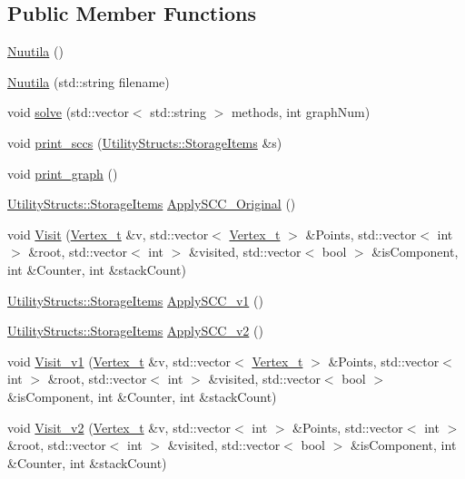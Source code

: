 \subsection*{Public Member Functions}
\begin{DoxyCompactItemize}
\item 
\hyperlink{class_nuutila_ab1ae0281145f693a922f5122d27cc23b}{Nuutila} ()
\item 
\hyperlink{class_nuutila_a00bb9066a5a1c9fb03e25481f4f47a0c}{Nuutila} (std\+::string filename)
\item 
void \hyperlink{class_nuutila_ae56bd15d2e57366eef0e044bf3a37d9e}{solve} (std\+::vector$<$ std\+::string $>$ methods, int graph\+Num)
\item 
void \hyperlink{class_nuutila_ae11b94c396dff5b8d9b7f69ae0d0831f}{print\+\_\+sccs} (\hyperlink{struct_utility_structs_1_1_storage_items}{Utility\+Structs\+::\+Storage\+Items} \&s)
\item 
void \hyperlink{class_nuutila_a0dc1cb3d0711a856a32a3743a85fb5c8}{print\+\_\+graph} ()
\item 
\hyperlink{struct_utility_structs_1_1_storage_items}{Utility\+Structs\+::\+Storage\+Items} \hyperlink{class_nuutila_a7d52f96cf25409704bfd7bf176fcc7c5}{Apply\+S\+C\+C\+\_\+\+Original} ()
\item 
void \hyperlink{class_nuutila_a2d43bc514d7375f9d63e60c06f90a60f}{Visit} (\hyperlink{class_graph_component_ae67114a6ce5a001dc35e1996e1b45aa0}{Vertex\+\_\+t} \&v, std\+::vector$<$ \hyperlink{class_graph_component_ae67114a6ce5a001dc35e1996e1b45aa0}{Vertex\+\_\+t} $>$ \&Points, std\+::vector$<$ int $>$ \&root, std\+::vector$<$ int $>$ \&visited, std\+::vector$<$ bool $>$ \&is\+Component, int \&Counter, int \&stack\+Count)
\item 
\hyperlink{struct_utility_structs_1_1_storage_items}{Utility\+Structs\+::\+Storage\+Items} \hyperlink{class_nuutila_a6c355594f68dad8c28684114a6df6700}{Apply\+S\+C\+C\+\_\+v1} ()
\item 
\hyperlink{struct_utility_structs_1_1_storage_items}{Utility\+Structs\+::\+Storage\+Items} \hyperlink{class_nuutila_a291d578f760e0f11a5c56c8a5fe02ebd}{Apply\+S\+C\+C\+\_\+v2} ()
\item 
void \hyperlink{class_nuutila_a83b47177cf452e80b3ceaf064ff59840}{Visit\+\_\+v1} (\hyperlink{class_graph_component_ae67114a6ce5a001dc35e1996e1b45aa0}{Vertex\+\_\+t} \&v, std\+::vector$<$ \hyperlink{class_graph_component_ae67114a6ce5a001dc35e1996e1b45aa0}{Vertex\+\_\+t} $>$ \&Points, std\+::vector$<$ int $>$ \&root, std\+::vector$<$ int $>$ \&visited, std\+::vector$<$ bool $>$ \&is\+Component, int \&Counter, int \&stack\+Count)
\item 
void \hyperlink{class_nuutila_afc7a8c27d8de17ac2679f839ff8c2749}{Visit\+\_\+v2} (\hyperlink{class_graph_component_ae67114a6ce5a001dc35e1996e1b45aa0}{Vertex\+\_\+t} \&v, std\+::vector$<$ int $>$ \&Points, std\+::vector$<$ int $>$ \&root, std\+::vector$<$ int $>$ \&visited, std\+::vector$<$ bool $>$ \&is\+Component, int \&Counter, int \&stack\+Count)
\end{DoxyCompactItemize}
